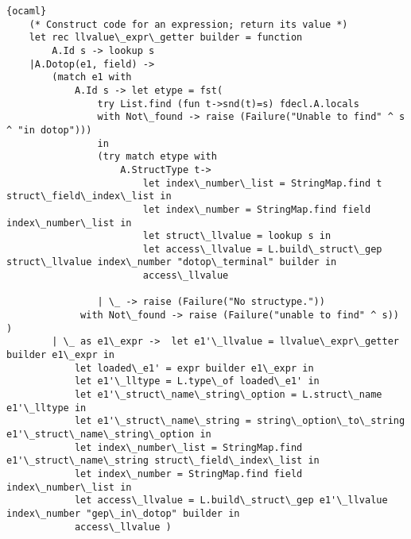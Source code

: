 \begin{lstlisting}{ocaml}
    (* Construct code for an expression; return its value *)
    let rec llvalue\_expr\_getter builder = function
     	A.Id s -> lookup s
	|A.Dotop(e1, field) ->
		(match e1 with
			A.Id s -> let etype = fst( 
				try List.find (fun t->snd(t)=s) fdecl.A.locals
				with Not\_found -> raise (Failure("Unable to find" ^ s ^ "in dotop")))
				in
				(try match etype with
					A.StructType t->
						let index\_number\_list = StringMap.find t struct\_field\_index\_list in
						let index\_number = StringMap.find field index\_number\_list in
						let struct\_llvalue = lookup s in
						let access\_llvalue = L.build\_struct\_gep struct\_llvalue index\_number "dotop\_terminal" builder in
						access\_llvalue

				| \_ -> raise (Failure("No structype."))
			 with Not\_found -> raise (Failure("unable to find" ^ s)) )
		| \_ as e1\_expr ->  let e1'\_llvalue = llvalue\_expr\_getter builder e1\_expr in
			let loaded\_e1' = expr builder e1\_expr in
			let e1'\_lltype = L.type\_of loaded\_e1' in
			let e1'\_struct\_name\_string\_option = L.struct\_name e1'\_lltype in
			let e1'\_struct\_name\_string = string\_option\_to\_string e1'\_struct\_name\_string\_option in
			let index\_number\_list = StringMap.find e1'\_struct\_name\_string struct\_field\_index\_list in
			let index\_number = StringMap.find field index\_number\_list in
			let access\_llvalue = L.build\_struct\_gep e1'\_llvalue index\_number "gep\_in\_dotop" builder in
			access\_llvalue )
	

\end{lstlisting}
